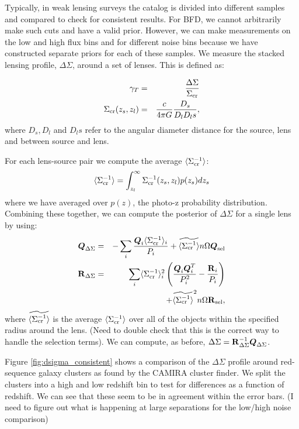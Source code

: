 \documentclass[useAMS,usenatbib]{mnras}
\newcommand{\vecQ}{\mbox{\boldmath $Q$}}
\newcommand{\matR}{\mbox{$\bf R$}}
\begin{document}
Typically, in weak lensing surveys the catalog is divided into different samples and compared to check for consistent results.  For BFD, we cannot arbitrarily make such cuts and have a valid prior.  However, we can make measurements on the low and high flux bins and for different noise bins because we have constructed separate priors for each of these samples.   We measure the stacked lensing profile, $\Delta\Sigma$, around a set of lenses.  This is defined as:

\begin{eqnarray}
\gamma_T & = & \frac{\Delta\Sigma} {\Sigma_{\rm cr}} \\ 
\Sigma_{\rm cr}(z_s,z_l) & = & \frac{c}{4\pi G} \frac{D_s}{D_l D_ls},
\end{eqnarray}
where $D_s,D_l$ and $D_ls$ refer to the angular diameter distance for the source, lens and between source and lens.

For each lens-source pair we compute the average $\langle\Sigma_{\rm cr}^{-1}\rangle$:
\begin{eqnarray}
\langle\Sigma_{\rm cr}^{-1}\rangle = \int_{z_l}^{\infty} \Sigma_{\rm cr}^{-1}(z_s,z_l)p(z_s)dz_s
\end{eqnarray}
where we have averaged over $p(z)$, the photo-z probability distribution.  Combining these together, we can compute the posterior of $\Delta\Sigma$ for a single lens by using:
\begin{eqnarray}
\vecQ_{\Delta\Sigma} & = & -\sum_i \frac{\vecQ_i \langle \Sigma_{\rm cr}^{-1}\rangle_i}{P_i} + \widetilde{\langle\Sigma_{\rm cr}^{-1}\rangle} n\Omega \vecQ_{\rm sel} \\
\matR_{\Delta\Sigma} & = &  \sum_i \langle\Sigma_{\rm cr}^{-1}\rangle_i^2 
\left(\frac{\vecQ_i\vecQ_i^T}{P_i^2} - \frac{\matR_i}{P_i}\right)\\
&  & + \widetilde{\langle\Sigma_{\rm cr}^{-1}\rangle}^2 n\Omega \matR_{\rm sel} \nonumber,
\end{eqnarray}
where $\widetilde{\langle\Sigma_{\rm cr}^{-1}\rangle}$ is the average $\langle\Sigma_{\rm cr}^{-1}\rangle$ over all of the objects within the specified radius around the lens.  (Need to double check that this is the correct way to handle the selection terms).  We can compute, as before, $\Delta\Sigma=\matR_{\Delta\Sigma}^{-1}\vecQ_{\Delta\Sigma} $.

Figure \ref{fig:dsigma_consistent} shows a comparison of the $\Delta\Sigma$ profile around red-sequence galaxy clusters as found by the CAMIRA \citep{Camira:inprep} cluster finder.  We split the clusters into a high and low redshift bin to test for differences as a function of redshift.  We can see that these seem to be in agreement within the error bars. (I need to figure out what is happening at large separations for the low/high noise comparison)
\end{document}
